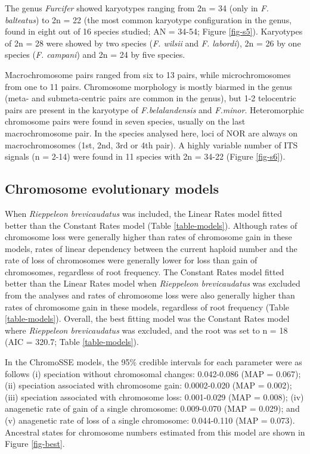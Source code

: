 \documentclass[a4paper, 12pt]{article}
\begin{document}
\noindent The genus \textit{Furcifer} showed karyotypes ranging from 2n = 34 (only in \textit{F. balteatus}) to 2n = 22 (the most common karyotype configuration in the genus, found in eight out of 16 species studied; AN = 34-54; Figure \ref{fig-s5}). 
Karyotypes of 2n = 28 were showed by two species (\textit{F. wilsii} and \textit{F. labordi}), 2n = 26 by one species (\textit{F. campani}) and 2n = 24 by five species. 

\noindent Macrochromosome pairs ranged from six to 13 pairs, while microchromosomes from one to 11 pairs. 
Chromosome morphology is mostly biarmed in the genus (meta- and submeta-centric pairs are common in the genus), but 1-2 telocentric pairs are present in the karyotype of \textit{F.belalandensis} and \textit{F.minor}.
Heteromorphic chromosome pairs were found in seven species, usually on the last macrochromosome pair. 
In the species analysed here, loci of NOR are always on macrochromosomes (1st, 2nd, 3rd or 4th pair). 
A highly variable number of ITS signals (n = 2-14) were found in 11 species with 2n = 34-22 (Figure \ref{fig-s6}).

\subsection{Chromosome evolutionary models}
When \textit{Rieppeleon brevicaudatus} was included, the Linear Rates model fitted better than the Constant Rates model (Table \ref{table-models}).
Although rates of chromosome loss were generally higher than rates of chromosome gain in these models, rates of linear dependency between the current haploid number and the rate of loss of chromosomes were generally lower for loss than gain of chromosomes, regardless of root frequency. 
The Constant Rates model fitted better than the Linear Rates model when \textit{Rieppeleon brevicaudatus} was excluded from the analyses and rates of chromosome loss were also generally higher than rates of chromosome gain in these models, regardless of root frequency (Table \ref{table-models}). 
Overall, the best fitting model was the Constant Rates model where \textit{Rieppeleon brevicaudatus} was excluded, and the root was set to n = 18 (AIC = 320.7; Table \ref{table-models}).

In the ChromoSSE models, the 95\% credible intervals for each parameter were as follows (i) speciation without chromosomal changes: 0.042-0.086 (MAP = 0.067); (ii) speciation associated with chromosome gain: 0.0002-0.020 (MAP = 0.002); (iii) speciation associated with chromosome loss: 0.001-0.029 (MAP = 0.008); (iv) anagenetic rate of gain of a single chromosome: 0.009-0.070 (MAP = 0.029); and (v) anagenetic rate of loss of a single chromosome: 0.044-0.110 (MAP = 0.073). 
Ancestral states for chromosome numbers estimated from this model are shown in Figure \ref{fig-best}.
\end{document}
